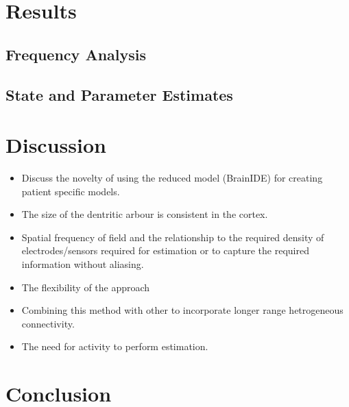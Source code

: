 \documentclass[12pt]{iopart}		%
\begin{document}
\section{Results}

\subsection{Frequency Analysis}

\subsection{State and Parameter Estimates}


\section{Discussion}

\begin{itemize}

	\item Discuss the novelty of using the reduced model (BrainIDE) for creating patient specific models. 
	\item The size of the dentritic arbour is consistent in the cortex.
	\item Spatial frequency of field and the relationship to the required density of electrodes/sensors required for estimation or to capture the required information without aliasing.
	
	\item The flexibility of the approach
	
	\item Combining this method with other to incorporate longer range hetrogeneous connectivity.
	
	\item The need for activity to perform estimation.
\end{itemize}

\section{Conclusion}
\appendix
\end{document}
